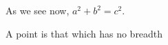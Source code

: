 


\begin{theorem}
As we see now, $a^2 + b^2 = c^2$.
\end{theorem}

\begin{definition}
A point is that which has no breadth
\end{definition}



